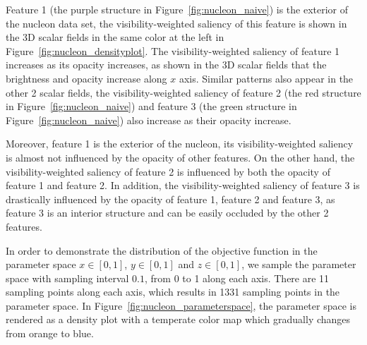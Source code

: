 Feature 1 (the purple structure in Figure~\ref{fig:nucleon_naive}) is the exterior of the nucleon data set, the visibility-weighted saliency of this feature is shown in the 3D scalar fields in the same color at the left in Figure~\ref{fig:nucleon_densityplot}.
The visibility-weighted saliency of feature 1 increases as its opacity increases, as shown in the 3D scalar fields that the brightness and opacity increase along $ x $ axis. Similar patterns also appear in the other 2 scalar fields, the visibility-weighted saliency of feature 2 (the red structure in Figure~\ref{fig:nucleon_naive}) and feature 3 (the green structure in Figure~\ref{fig:nucleon_naive}) also increase as their opacity increase.

Moreover, feature 1 is the exterior of the nucleon, its visibility-weighted saliency is almost not influenced by the opacity of other features. On the other hand, the visibility-weighted saliency of feature 2 is influenced by both the opacity of feature 1 and feature 2. In addition, the visibility-weighted saliency of feature 3 is drastically influenced by the opacity of feature 1, feature 2 and feature 3, as feature 3 is an interior structure and can be easily occluded by the other 2 features.

In order to demonstrate the distribution of the objective function in the parameter space $ x \in [0,1] $, $ y \in [0,1] $ and $ z \in [0,1] $, we sample the parameter space with sampling interval $ 0.1 $, from 0 to 1 along each axis. There are 11 sampling points along each axis, which results in 1331 sampling points in the parameter space. In Figure~\ref{fig:nucleon_parameterspace}, the parameter space is rendered as a density plot with a temperate color map which gradually changes from orange to blue.

